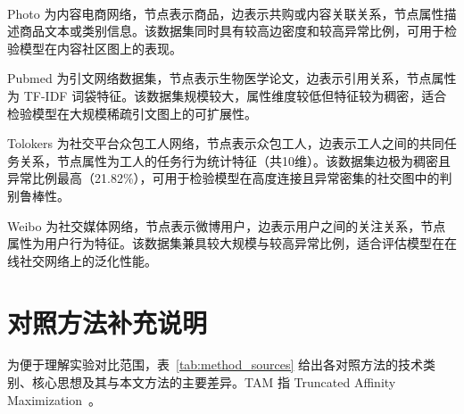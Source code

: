 ﻿﻿﻿﻿    \documentclass[conference, onecolumn]{IEEEtran}
\begin{document}
    Photo 为内容电商网络，节点表示商品，边表示共购或内容关联关系，节点属性描述商品文本或类别信息。该数据集同时具有较高边密度和较高异常比例，可用于检验模型在内容社区图上的表现。

    Pubmed 为引文网络数据集，节点表示生物医学论文，边表示引用关系，节点属性为 TF-IDF 词袋特征。该数据集规模较大，属性维度较低但特征较为稠密，适合检验模型在大规模稀疏引文图上的可扩展性。

    Tolokers 为社交平台众包工人网络，节点表示众包工人，边表示工人之间的共同任务关系，节点属性为工人的任务行为统计特征（共10维）。该数据集边极为稠密且异常比例最高（21.82\%），可用于检验模型在高度连接且异常密集的社交图中的判别鲁棒性。

    Weibo 为社交媒体网络，节点表示微博用户，边表示用户之间的关注关系，节点属性为用户行为特征。该数据集兼具较大规模与较高异常比例，适合评估模型在在线社交网络上的泛化性能。

    \FloatBarrier
    \section{对照方法补充说明}
    \label{app:method_sources}

    为便于理解实验对比范围，表~\ref{tab:method_sources} 给出各对照方法的技术类别、核心思想及其与本文方法的主要差异。TAM 指 Truncated Affinity Maximization~\cite{ref4}。
\end{document}
